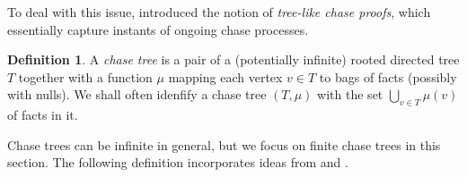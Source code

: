 \documentclass[12pt]{report}
\theoremstyle{plain}
\theoremstyle{definition}
\newtheorem{definition}[theorem]{Definition}
\begin{document}
To deal with this issue, \cite{benedikt_buron_germano_kappelmann_motik_2022} introduced the notion of \emph{tree-like chase proofs}, which essentially capture instants of ongoing chase processes.

\begin{definition}
  A \emph{chase tree} is a pair of a (potentially infinite) rooted directed tree $T$ together with a function $\mu$ mapping each vertex $v \in T$ to bags of facts (possibly with nulls). We shall often idenfify a chase tree $(T, \mu)$ with the set $\bigcup_{v \in T} \mu(v)$ of facts in it.
\end{definition}

Chase trees can be infinite in general, but we focus on finite chase trees in this section. The following definition incorporates ideas from \cite{benedikt_buron_germano_kappelmann_motik_2022} and \cite{kappelmann_2019}.
\end{document}
